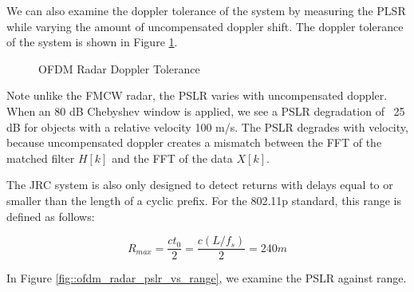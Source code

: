 \documentclass[conference]{IEEEtran}
\begin{document}

We can also examine the doppler tolerance of the system by measuring the PLSR while varying the amount of uncompensated doppler shift. The doppler tolerance of the system is shown in Figure \ref{fig::ofdm_radar_doppler_tolerance}.

\begin{figure}[H]
\centering
{}
\caption{OFDM Radar Doppler Tolerance}
\label{fig::ofdm_radar_doppler_tolerance}
\end{figure}

Note unlike the FMCW radar, the PSLR varies with uncompensated doppler. When an 80 dB Chebyshev window is applied, we see a PSLR degradation of ~25 dB for objects with a relative velocity 100 m/s. The PSLR degrades with velocity, because uncompensated doppler creates a mismatch between the FFT of the matched filter $H[k]$ and the FFT of the data $X[k]$.

The JRC system is also only designed to detect returns with delays equal to or smaller than the length of a cyclic prefix. For the 802.11p standard, this range is defined as follows:

\begin{equation}
R_{max} = \frac{ct_0}{2} = \frac{c(L/f_s)}{2} = 240 m
\end{equation}

In Figure \ref{fig::ofdm_radar_pslr_vs_range}, we examine the PSLR against range.
\end{document}
